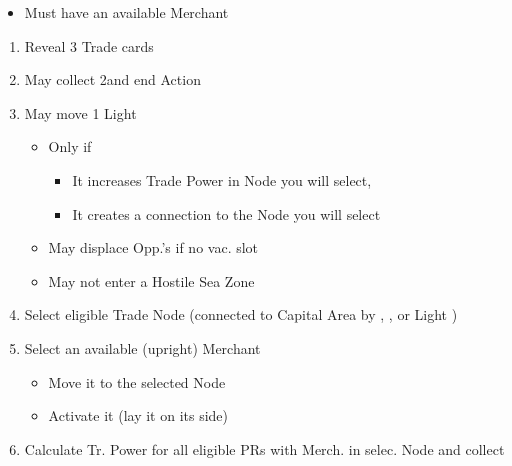 \documentclass[10pt]{article}
\begin{document}
\begin{itemize}
	\item Must have an available Merchant
\end{itemize}
\begin{enumerate}
	\item Reveal 3 Trade cards
	\item May collect 2\ducats and end Action
	\item May move 1 Light \ship
	\begin{itemize}
		\item Only if
		\begin{itemize}
			\item It increases Trade Power in Node you will select, 
			\item It creates a connection to the Node you will select
		\end{itemize}
		\item May displace Opp.'s \ship if no vac. slot
		\item May not enter a Hostile Sea Zone
	\end{itemize}
	\item Select eligible Trade Node (connected to Capital Area by \towns, \vassals, \influence or Light \ships)
	\item Select an available (upright) Merchant
	\begin{itemize}
		\item Move it to the selected Node
		\item Activate it (lay it on its side)
	\end{itemize}
	\item Calculate Tr. Power for all eligible PRs with Merch. in selec. Node and collect \ducats
\end{enumerate}
\end{document}
